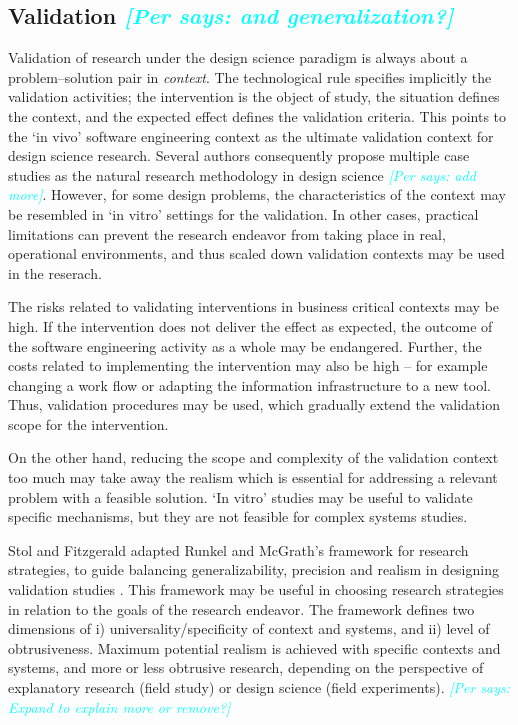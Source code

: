 \documentclass[graybox]{svmult}
\newcommand{\per}[1]{\textcolor{cyan}{{\it [Per says: #1]}}}
\newcommand{\per}[1]{}
\begin{document}
\subsection{Validation \per{and generalization?}}

Validation of research under the design science paradigm is always about a problem--solution pair in \emph{context}. The technological rule specifies implicitly the validation activities; the intervention is the object of study, the situation defines the context, and the expected effect defines the validation criteria. This points to the `in vivo' software engineering context as the ultimate validation context for design science research. Several authors consequently propose multiple case studies as the natural research methodology in design science \cite{van_aken_management_2004}\per{add more}. However, for some design problems, the characteristics of the context may be resembled in `in vitro' settings for the validation. In other cases, practical limitations can prevent the research endeavor from taking place in real, operational environments, and thus scaled down validation contexts may be used in the reserach. 

The risks related to validating interventions in business critical contexts may be high. If the intervention does not deliver the effect as expected, the outcome of the software engineering activity as a whole may be endangered. Further, the costs related to implementing the intervention may also be high -- for example changing a work flow or adapting the information infrastructure to a new tool. Thus, validation procedures may be used, which gradually extend the validation scope for the intervention.

On the other hand, reducing the scope and complexity of the validation context too much may take away the realism which is essential for addressing a relevant problem with a feasible solution. `In vitro' studies may be useful to validate specific mechanisms, but they are not feasible for complex systems studies.  

Stol and Fitzgerald adapted Runkel and McGrath's framework for research strategies, to guide balancing generalizability, precision and realism in designing validation studies \cite{StolABC18}. This framework may be useful in choosing research strategies in relation to the goals of the research endeavor. The framework defines two dimensions of i) universality/specificity of context and systems, and ii) level of obtrusiveness. Maximum potential realism is achieved with specific contexts and systems, and more or less obtrusive research, depending on the perspective of explanatory research (field study) or design science (field experiments). \per{Expand to explain more or remove?} 
\end{document}

